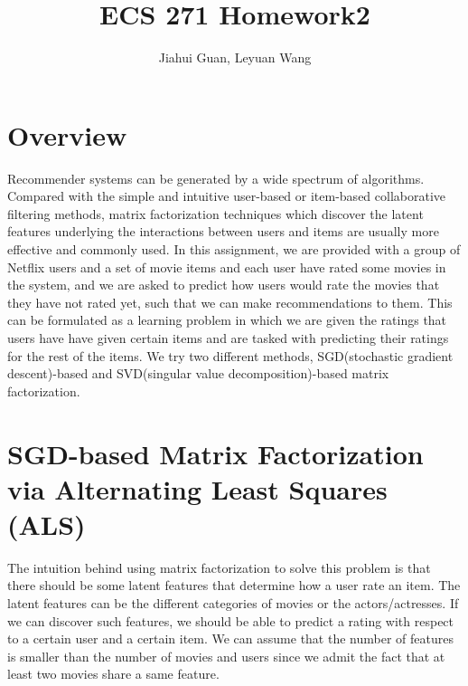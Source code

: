 \documentclass{article}
\title{ECS 271 Homework2}
\date{\vspace{-5ex}}
\begin{document}
\author{Jiahui Guan, Leyuan Wang}
\maketitle
\section{Overview}
Recommender systems can be generated by a wide spectrum of algorithms. Compared with the simple and intuitive user-based or item-based collaborative filtering methods, matrix factorization techniques which discover the latent features underlying the interactions between users and items are usually more effective and commonly used. In this assignment, we are provided with a group of Netflix users and a set of movie items and each user have rated some movies in the system, and we are asked to predict how users would rate the movies that they have not rated yet, such that we can make recommendations to them. This can be formulated as a learning problem in which we are given the ratings that users have have given certain items and are tasked with predicting their ratings for the rest of the items. We try two different methods, SGD(stochastic gradient descent)-based and SVD(singular value decomposition)-based matrix factorization. 

\section{SGD-based Matrix Factorization via Alternating Least Squares (ALS)}
The intuition behind using matrix factorization to solve this problem is that there should be some latent features that determine how a user rate an item. The latent features can be the different categories of movies or the actors/actresses. If we can discover such features, we should be able to predict a rating with respect to a certain user and a certain item. We can assume that the number of features is smaller than the number of movies and users since we admit the fact that at least two movies share a same feature. 
\end{document}
